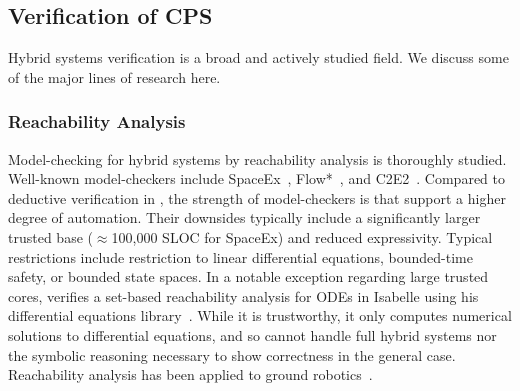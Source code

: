 \documentclass[12pt]{cmuthesis}
\theoremstyle{definition}
\theoremstyle{remark}
\begin{document}
\subsection{Verification of CPS}
%
Hybrid systems verification is a broad and actively studied field.
We discuss some of the major lines of research here.

%
%

\subsubsection{Reachability Analysis}
Model-checking for hybrid systems by reachability analysis is thoroughly studied.
Well-known model-checkers include SpaceEx~\cite{DBLP:conf/cav/FrehseGDCRLRGDM11}, Flow*~\cite{DBLP:conf/cav/ChenAS13}, and C2E2~\cite{DBLP:conf/tacas/DuggiralaMVP15}.
Compared to deductive verification in \dL, the strength of model-checkers is that support a higher degree of automation.
Their downsides typically include a significantly larger trusted base (${\approx}$100,000 SLOC for SpaceEx) and reduced expressivity.
Typical restrictions include restriction to linear differential equations, bounded-time safety, or bounded state spaces.
In a notable exception regarding large trusted cores, \cite{DBLP:conf/tacas/Immler15} verifies a set-based reachability analysis for ODEs in Isabelle using his differential equations library~\cite{DBLP:conf/itp/ImmlerT16}.
While it is trustworthy, it only computes numerical solutions to differential equations, and so cannot handle full hybrid systems nor the symbolic reasoning necessary to show correctness in the general case.
Reachability analysis has been applied to ground robotics~\cite{chen2015benchmark}.
\end{document}
